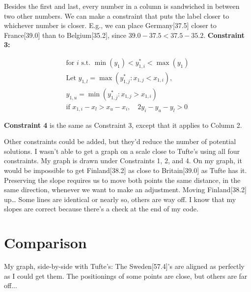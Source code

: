 \documentclass[12pt,twoside]{extarticle}
\begin{document}
{\begin{minipage}[t]{0.53\textwidth}
Besides the first and last, every number in a column is sandwiched in between two other numbers.  We can make a constraint that puts the label closer to whichever number is closer.  E.g., we can place Germany[37.5] closer to France[39.0] than to Belgium[35.2], since $39.0-37.5 < 37.5-35.2$.  \textbf{Constraint 3:}

\begin{gather}
\text{for }i \text{ s.t. }\min(y_1) < y_{1,i}^* < \max(y_1) \\
\text{Let } y_{1,l} = \max(y_{1,j}^*:x_{1,j} < x_{1,i}), \\
y_{1,u} = \min(y_{1,j}^*:x_{1,j} > x_{1,i})\\
\text{if }x_{1,i}-x_l > x_u-x_i, \quad 2y_i-y_u-y_l > 0
\end{gather}

\textbf{Constraint 4} is the same as Constraint 3, except that it applies to Column 2. 


Other constraints could be added, but they'd reduce the number of potential solutions.  I wasn't able to get a graph on a scale close to Tufte's using all four constraints.  My graph is drawn under Constraints 1, 2, and 4. 
On my graph, it would be impossible to get Finland[38.2] as close to Britain[39.0] as Tufte has it.  Preserving the slope requires us to move both points the same distance, in the same direction, whenever we want to make an adjustment.  Moving Finland[38.2] up… 
Some lines are identical or nearly so, others are way off.  I know that my slopes are correct because there’s a check at the end of my code.
\end{minipage}}
\newpage
\begin{minipage}[]{0.42\textwidth}
\section{Comparison}
\textcolor{myblue}{My graph}, side-by-side with Tufte's:  The Sweden[57.4]'s are aligned as perfectly as I could get them.  The positionings of some points are close, but others are far off...
\end{minipage}%
\hfill
\vspace{1.5em}
\newpage
\newpage
\end{document}
